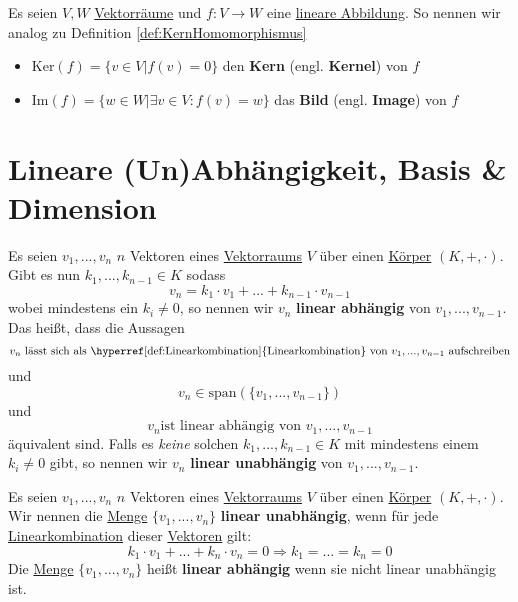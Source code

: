 \documentclass[../../main.tex]{subfiles}
\begin{document}
	\begin{definition}
		\label{def:KernelLineareAbbildung}
		\label{def:KernLineareAbbildung}
		\label{def:ImageLineareAbbildung}
		\label{def:BildLineareAbbildung}
		Es seien $V, W$ \hyperref[def:Vektorraum]{Vektorräume} und $f: V \rightarrow W$ eine \hyperref[def:LineareAbbildung]{lineare Abbildung}. So nennen wir analog zu Definition \ref{def:KernHomomorphismus}
		\begin{itemize}
			\item $\textrm{Ker}(f) = \{ v \in V | f(v) = 0 \}$ den \textbf{Kern} (engl. \textbf{Kernel}) von $f$
			\item $\textrm{Im}(f) = \{ w \in W | \exists v \in V: f(v)=w \}$ das \textbf{Bild} (engl. \textbf{Image}) von $f$
		\end{itemize}
	\end{definition}

	\section{Lineare (Un)Abhängigkeit, Basis \& Dimension}

	\begin{definition}
		\label{def:LineareAbhängigkeit}
		\label{def:LineareUnabhängigkeit}
		Es seien $v_1,...,v_n$ $n$ Vektoren eines \hyperref[def:Vektorraum]{Vektorraums} $V$ über einen \hyperref[def:Körper]{Körper} $(K,+,\cdot)$. Gibt es nun $k_1,...,k_{n-1} \in K$ sodass $$v_n = k_1 \cdot v_1 + ... + k_{n-1} \cdot v_{n-1}$$ wobei mindestens ein $k_i \not = 0$, so nennen wir $v_n$ \textbf{linear abhängig} von $v_1,...,v_{n-1}$. Das heißt, dass die Aussagen $$v_n \textrm{ lässt sich als \hyperref[def:Linearkombination]{Linearkombination} von } v_1,...,v_{n-1} \textrm{ aufschreiben}$$ und $$v_n \in \textrm{span}(\{v_1,...,v_{n-1}\})$$ und $$v_n \textrm{ist linear abhängig von } v_1,...,v_{n-1}$$ äquivalent sind. Falls es \textit{keine} solchen $k_1,...,k_{n-1} \in K$ mit mindestens einem $k_i \not = 0$ gibt, so nennen wir $v_n$ \textbf{linear unabhängig} von $v_1,...,v_{n-1}$.
	\end{definition}

	\begin{definition}
		\label{def:LineareAbhängigkeitMenge}
		\label{def:LineareUnabhängigkeitMenge}
		Es seien $v_1,...,v_n$ $n$ Vektoren eines \hyperref[def:Vektorraum]{Vektorraums} $V$ über einen \hyperref[def:Körper]{Körper} $(K,+,\cdot)$. Wir nennen die \hyperref[def:Menge]{Menge} $\{v_1,...,v_n\}$ \textbf{linear unabhängig}, wenn für jede \hyperref[def:Linearkombination]{Linearkombination} dieser \hyperref[def:Vektor]{Vektoren} gilt: $$k_1 \cdot v_1 + ... + k_n \cdot v_n = 0 \Rightarrow k_1 = ... = k_n = 0$$ Die \hyperref[def:Menge]{Menge} $\{v_1,...,v_n\}$ heißt \textbf{linear abhängig} wenn sie nicht linear unabhängig ist. 
	\end{definition}
\end{document}
